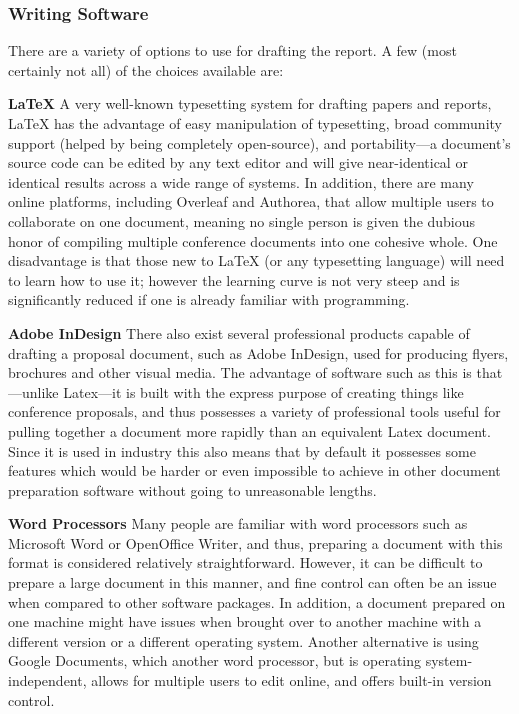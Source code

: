 \documentclass[12pt]{article}
\begin{document}
\subsubsection{Writing Software}
There are a variety of options to use for drafting the report.
A few (most certainly not all) of the choices available are:

\textbf{\LaTeX}\newline
A very well-known typesetting system for drafting papers and reports, LaTeX has the advantage of easy manipulation of typesetting, broad community support (helped by being completely open-source), and portability---a document's source code can be edited by any text editor and will give near-identical or identical results across a wide range of systems. In addition, there are many online platforms, including Overleaf and Authorea, that allow multiple users to collaborate on one document, meaning no single person is given the dubious honor of compiling multiple conference documents into one cohesive whole. One disadvantage is that those new to LaTeX (or any typesetting language) will need to learn how to use it; however the learning curve is not very steep and is significantly reduced if one is already familiar with programming.

\textbf{Adobe InDesign}\newline
There also exist several professional products capable of drafting a proposal document, such as Adobe InDesign, used for producing flyers, brochures and other visual media. The advantage of software such as this is that---unlike Latex---it is built with the express purpose of creating things like conference proposals, and thus possesses a variety of professional tools useful for pulling together a document more rapidly than an equivalent Latex document. Since it is used in industry this also means that by default it possesses some features which would be harder or even impossible to achieve in other document preparation software without going to unreasonable lengths.

\textbf{Word Processors}\newline
Many people are familiar with word processors such as Microsoft Word or OpenOffice Writer, and thus, preparing a document with this format is considered relatively straightforward. However, it can be difficult to prepare a large document in this manner, and fine control can often be an issue when compared to other software packages. In addition, a document prepared on one machine might have issues when brought over to another machine with a different version or a different operating system.
Another alternative is using Google Documents, which another word processor, but is operating system-independent, allows for multiple users to edit online, and offers built-in version control.
\end{document}
